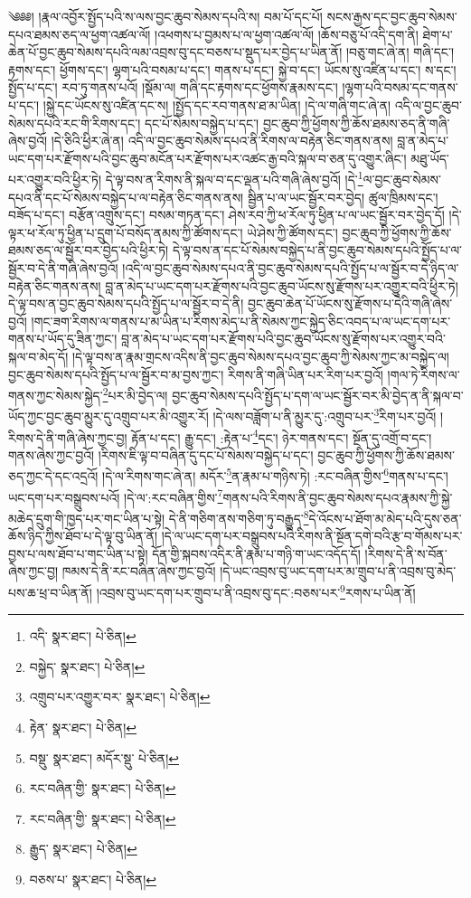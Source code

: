 \setcounter{footnote}{0} 
༄༅༅། །རྣལ་འབྱོར་སྤྱོད་པའི་ས་ལས་བྱང་ཆུབ་སེམས་དཔའི་ས། བམ་པོ་དང་པོ། སངས་རྒྱས་དང་བྱང་ཆུབ་སེམས་དཔའ་ཐམས་ཅད་ལ་ཕྱག་འཚལ་ལོ། །འཕགས་པ་བྱམས་པ་ལ་ཕྱག་འཚལ་ལོ། །ཆོས་བཅུ་པོ་འདི་དག་ནི། ཐེག་པ་ཆེན་པོ་བྱང་ཆུབ་སེམས་དཔའི་ལམ་འབྲས་བུ་དང་བཅས་པ་སྡུད་པར་བྱེད་པ་ཡིན་ནོ། །བཅུ་གང་ཞེ་ན། གཞི་དང་། རྟགས་དང་། ཕྱོགས་དང་། ལྷག་པའི་བསམ་པ་དང་། གནས་པ་དང་། སྐྱེ་བ་དང་། ཡོངས་སུ་འཛིན་པ་དང་། ས་དང་། སྤྱོད་པ་དང་། རབ་ཏུ་གནས་པའོ། །སྡོམ་ལ། གཞི་དང་རྟགས་དང་ཕྱོགས་རྣམས་དང་། །ལྷག་པའི་བསམ་དང་གནས་པ་དང་། །སྐྱེ་དང་ཡོངས་སུ་འཛིན་དང་ས། །སྤྱོད་དང་རབ་གནས་ཐ་མ་ཡིན། །དེ་ལ་གཞི་གང་ཞེ་ན། འདི་ལ་བྱང་ཆུབ་སེམས་དཔའི་རང་གི་རིགས་དང་། དང་པོ་སེམས་བསྐྱེད་པ་དང་། བྱང་ཆུབ་ཀྱི་ཕྱོགས་ཀྱི་ཆོས་ཐམས་ཅད་ནི་གཞི་ཞེས་བྱའོ། །དེ་ཅིའི་ཕྱིར་ཞེ་ན། འདི་ལ་བྱང་ཆུབ་སེམས་དཔའ་ནི་རིགས་ལ་བརྟེན་ཅིང་གནས་ནས། བླ་ན་མེད་པ་ཡང་དག་པར་རྫོགས་པའི་བྱང་ཆུབ་མངོན་པར་རྫོགས་པར་འཚང་རྒྱ་བའི་སྐལ་བ་ཅན་དུ་འགྱུར་ཞིང་། མཐུ་ཡོད་པར་འགྱུར་བའི་ཕྱིར་ཏེ། དེ་ལྟ་བས་ན་རིགས་ནི་སྐལ་བ་དང་ལྡན་པའི་གཞི་ཞེས་བྱའོ། །དེ་\footnote{འདི་  སྣར་ཐང་།  པེ་ཅིན། }ལ་བྱང་ཆུབ་སེམས་དཔའ་ནི་དང་པོ་སེམས་བསྐྱེད་པ་ལ་བརྟེན་ཅིང་གནས་ནས། སྦྱིན་པ་ལ་ཡང་སྦྱོར་བར་བྱེད། ཚུལ་ཁྲིམས་དང་། བཟོད་པ་དང་། བརྩོན་འགྲུས་དང་། བསམ་གཏན་དང་། ཤེས་རབ་ཀྱི་ཕ་རོལ་ཏུ་ཕྱིན་པ་ལ་ཡང་སྦྱོར་བར་བྱེད་དོ། །དེ་ལྟར་ཕ་རོལ་ཏུ་ཕྱིན་པ་དྲུག་པོ་བསོད་ནམས་ཀྱི་ཚོགས་དང་། ཡེ་ཤེས་ཀྱི་ཚོགས་དང་། བྱང་ཆུབ་ཀྱི་ཕྱོགས་ཀྱི་ཆོས་ཐམས་ཅད་ལ་སྦྱོར་བར་བྱེད་པའི་ཕྱིར་ཏེ། དེ་ལྟ་བས་ན་དང་པོ་སེམས་བསྐྱེད་པ་ནི་བྱང་ཆུབ་སེམས་དཔའི་སྤྱོད་པ་ལ་སྦྱོར་བ་དེ་ནི་གཞི་ཞེས་བྱའོ། །འདི་ལ་བྱང་ཆུབ་སེམས་དཔའ་ནི་བྱང་ཆུབ་སེམས་དཔའི་སྤྱོད་པ་ལ་སྦྱོར་བ་དེ་ཉིད་ལ་བརྟེན་ཅིང་གནས་ནས། བླ་ན་མེད་པ་ཡང་དག་པར་རྫོགས་པའི་བྱང་ཆུབ་ཡོངས་སུ་རྫོགས་པར་འགྱུར་བའི་ཕྱིར་ཏེ། དེ་ལྟ་བས་ན་བྱང་ཆུབ་སེམས་དཔའི་སྤྱོད་པ་ལ་སྦྱོར་བ་དེ་ནི། བྱང་ཆུབ་ཆེན་པོ་ཡོངས་སུ་རྫོགས་པ་དེའི་གཞི་ཞེས་བྱའོ། །གང་ཟག་རིགས་ལ་གནས་པ་མ་ཡིན་པ་རིགས་མེད་པ་ནི་སེམས་ཀྱང་སྐྱེད་ཅིང་འབད་པ་ལ་ཡང་དག་པར་གནས་པ་ཡོད་དུ་ཟིན་ཀྱང་། བླ་ན་མེད་པ་ཡང་དག་པར་རྫོགས་པའི་བྱང་ཆུབ་ཡོངས་སུ་རྫོགས་པར་འགྱུར་བའི་སྐལ་བ་མེད་དོ། །དེ་ལྟ་བས་ན་རྣམ་གྲངས་འདིས་ནི་བྱང་ཆུབ་སེམས་དཔའ་བྱང་ཆུབ་ཀྱི་སེམས་ཀྱང་མ་བསྐྱེད་ལ། བྱང་ཆུབ་སེམས་དཔའི་སྤྱོད་པ་ལ་སྦྱོར་བ་མ་བྱས་ཀྱང་། རིགས་ནི་གཞི་ཡིན་པར་རིག་པར་བྱའོ། །གལ་ཏེ་རིགས་ལ་གནས་ཀྱང་སེམས་སྐྱེད་\footnote{བསྐྱེད་  སྣར་ཐང་།  པེ་ཅིན། }པར་མི་བྱེད་ལ། བྱང་ཆུབ་སེམས་དཔའི་སྤྱོད་པ་དག་ལ་ཡང་སྦྱོར་བར་མི་བྱེད་ན་ནི་སྐལ་བ་ཡོད་ཀྱང་བྱང་ཆུབ་མྱུར་དུ་འགྲུབ་པར་མི་འགྱུར་རོ། །དེ་ལས་བཟློག་པ་ནི་མྱུར་དུ་:འགྲུབ་པར་\footnote{འགྲུབ་པར་འགྱུར་བར་  སྣར་ཐང་།  པེ་ཅིན། }རིག་པར་བྱའོ། །རིགས་དེ་ནི་གཞི་ཞེས་ཀྱང་བྱ། རྟོན་པ་དང་། རྒྱུ་དང་། :རྟེན་པ་\footnote{རྟེན་  སྣར་ཐང་།  པེ་ཅིན། }དང་། ཉེར་གནས་དང་། སྔོན་དུ་འགྲོ་བ་དང་། གནས་ཞེས་ཀྱང་བྱའོ། །རིགས་ཇི་ལྟ་བ་བཞིན་དུ་དང་པོ་སེམས་བསྐྱེད་པ་དང་། བྱང་ཆུབ་ཀྱི་ཕྱོགས་ཀྱི་ཆོས་ཐམས་ཅད་ཀྱང་དེ་དང་འདྲའོ། །དེ་ལ་རིགས་གང་ཞེ་ན། མདོར་\footnote{བསྡུ་  སྣར་ཐང་། མདོར་སྡུ་  པེ་ཅིན། }ན་རྣམ་པ་གཉིས་ཏེ། :རང་བཞིན་གྱིས་\footnote{རང་བཞིན་གྱི་  སྣར་ཐང་།  པེ་ཅིན། }གནས་པ་དང་། ཡང་དག་པར་བསྒྲུབས་པའོ། །དེ་ལ་:རང་བཞིན་གྱིས་\footnote{རང་བཞིན་གྱི་  སྣར་ཐང་།  པེ་ཅིན། }གནས་པའི་རིགས་ནི་བྱང་ཆུབ་སེམས་དཔའ་རྣམས་ཀྱི་སྐྱེ་མཆེད་དྲུག་གི་ཁྱད་པར་གང་ཡིན་པ་སྟེ། དེ་ནི་གཅིག་ནས་གཅིག་ཏུ་བརྒྱུད་\footnote{རྒྱུད་  སྣར་ཐང་།  པེ་ཅིན། }དེ་འོངས་པ་ཐོག་མ་མེད་པའི་དུས་ཅན་ཆོས་ཉིད་ཀྱིས་ཐོབ་པ་དེ་ལྟ་བུ་ཡིན་ནོ། །དེ་ལ་ཡང་དག་པར་བསྒྲུབས་པའི་རིགས་ནི་སྔོན་དགེ་བའི་རྩ་བ་གོམས་པར་བྱས་པ་ལས་ཐོབ་པ་གང་ཡིན་པ་སྟེ། དོན་གྱི་སྐབས་འདིར་ནི་རྣམ་པ་གཉི་ག་ཡང་འདོད་དོ། །རིགས་དེ་ནི་ས་བོན་ཞེས་ཀྱང་བྱ། ཁམས་དེ་ནི་རང་བཞིན་ཞེས་ཀྱང་བྱའོ། །དེ་ཡང་འབྲས་བུ་ཡང་དག་པར་མ་གྲུབ་པ་ནི་འབྲས་བུ་མེད་པས་ཆ་ཕྲ་བ་ཡིན་ནོ། །འབྲས་བུ་ཡང་དག་པར་གྲུབ་པ་ནི་འབྲས་བུ་དང་:བཅས་པར་\footnote{བཅས་པ་  སྣར་ཐང་།  པེ་ཅིན། }རགས་པ་ཡིན་ནོ། 
